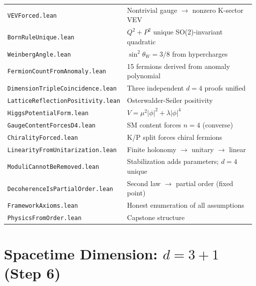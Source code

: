 \documentclass[11pt,letterpaper]{article}
\begin{document}
\begin{center}
\begin{tabular}{@{}ll@{}}
\texttt{VEVForced.lean} & Nontrivial gauge $\to$ nonzero K-sector VEV \\
\texttt{BornRuleUnique.lean} & $Q^2 + P^2$ unique SO(2)-invariant quadratic \\
\texttt{WeinbergAngle.lean} & $\sin^2\theta_W = 3/8$ from hypercharges \\
\texttt{FermionCountFromAnomaly.lean} & 15 fermions derived from anomaly polynomial \\
\texttt{DimensionTripleCoincidence.lean} & Three independent $d{=}4$ proofs unified \\
\texttt{LatticeReflectionPositivity.lean} & Osterwalder-Seiler positivity \\
\texttt{HiggsPotentialForm.lean} & $V = \mu^2|\phi|^2 + \lambda|\phi|^4$ \\
\texttt{GaugeContentForcesD4.lean} & SM content forces $n{=}4$ (converse) \\
\texttt{ChiralityForced.lean} & K/P split forces chiral fermions \\
\texttt{LinearityFromUnitarization.lean} & Finite holonomy $\to$ unitary $\to$ linear \\
\texttt{ModuliCannotBeRemoved.lean} & Stabilization adds parameters; $d{=}4$ unique \\
\texttt{DecoherenceIsPartialOrder.lean} & Second law $\to$ partial order (fixed point) \\
\texttt{FrameworkAxioms.lean} & Honest enumeration of all assumptions \\
\texttt{PhysicsFromOrder.lean} & Capstone structure \\
\bottomrule
\end{tabular}
\end{center}

\section{Spacetime Dimension: $d = 3{+}1$ (Step 6)}
\end{document}
